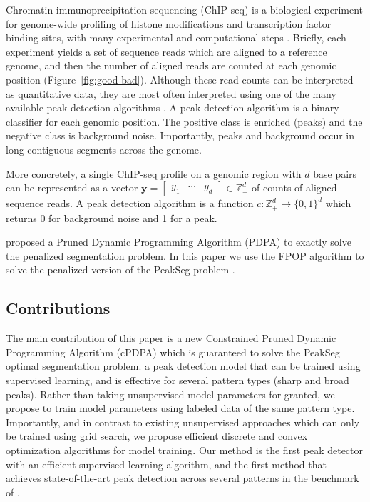 \documentclass{article}
\newcommand{\ZZ}{\mathbb Z}
\begin{document}
Chromatin immunoprecipitation sequencing (ChIP-seq) is a biological
experiment for genome-wide profiling of histone modifications and
transcription factor binding sites, with many experimental and
computational steps \citep{practical}. Briefly, each experiment yields
a set of sequence reads which are aligned to a reference genome, and
then the number of aligned reads are counted at each genomic position
(Figure~\ref{fig:good-bad}). Although these read counts can be
interpreted as quantitative data, they are most often interpreted
using one of the many available peak detection algorithms
\citep{evaluation2010, rye2010manually, chip-seq-bench}. A peak
detection algorithm is a binary classifier for each genomic
position. The positive class is enriched (peaks) and the negative
class is background noise. Importantly, peaks and background occur in
long contiguous segments across the genome.

More concretely, a single ChIP-seq profile on a genomic region with
$d$ base pairs can be represented as a vector $\mathbf y= \left[
  \begin{array}{ccc}
    y_1 & \cdots & y_d
  \end{array}
\right]\in\ZZ_+^d$ of counts of aligned sequence reads. A peak
detection algorithm is a function $c:\ZZ_+^d
\rightarrow \{0, 1\}^d$ which returns 0 for background noise and 1 for
a peak. 

\citet{pruned-dp} proposed a Pruned Dynamic Programming Algorithm
(PDPA) to exactly solve the penalized segmentation problem. In this
paper we use the FPOP algorithm to solve the penalized version of the
PeakSeg problem \citep{PeakSeg}.

\subsection{Contributions 
}

The main contribution of this paper is a new Constrained Pruned
Dynamic Programming Algorithm (cPDPA) which is guaranteed to solve the
PeakSeg optimal segmentation problem. a peak detection model that can
be trained using supervised learning, and is effective for several
pattern types (sharp and broad peaks). Rather than taking unsupervised
model parameters for granted, we propose to train model parameters
using labeled data of the same pattern type. Importantly, and in
contrast to existing unsupervised approaches which can only be trained
using grid search, we propose efficient discrete and convex
optimization algorithms for model training. Our method is the first
peak detector with an efficient supervised learning algorithm, and the
first method that achieves state-of-the-art peak detection across
several patterns in the benchmark of \citet{hocking2014visual}.
\end{document}
